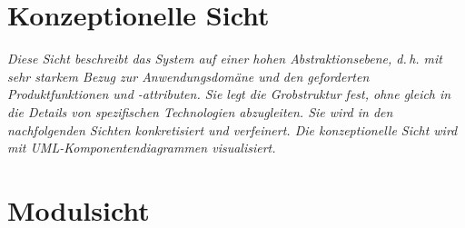 \documentclass[enabledeprecatedfontcommands,fontsize=12pt,paper=a4,twoside]{scrartcl}
\begin{document}
\section{Konzeptionelle Sicht}
\label{sec:konzeptionell}

{\it Diese Sicht beschreibt das System auf einer hohen Abstraktionsebene,
d.\,h. mit sehr starkem Bezug zur Anwendungsdomäne und den geforderten
Produktfunktionen und \linebreak-attributen. Sie legt die Grobstruktur fest,
ohne gleich in die Details von spezifischen Technologien abzugleiten.
Sie wird in den nachfolgenden Sichten konkretisiert und verfeinert. Die
konzeptionelle Sicht wird mit {UML}-Komponentendiagrammen visualisiert.}

\section{Modulsicht}
\label{sec:modulsicht}
\end{document}
